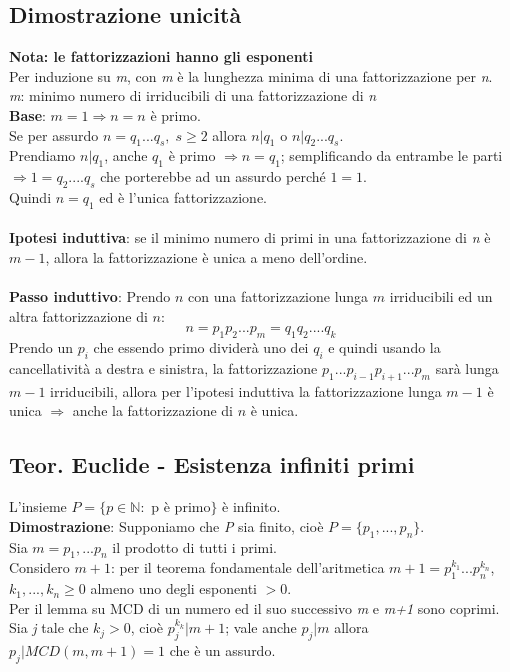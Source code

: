 \subsection{Dimostrazione unicità}
\textbf{Nota: le fattorizzazioni hanno gli esponenti}
\\Per induzione su \textit{m}, con \textit{m} è la lunghezza minima di una fattorizzazione per \textit{n}.
\\
\textit{m}: minimo numero di irriducibili di una fattorizzazione di \textit{n}
\\
\textbf{Base}: \(m=1\Rightarrow n=n\) è primo.
\\
Se per assurdo \(n=q_1...q_s,\; s\geq 2\) allora \(n|q_1\) o \(n|q_2...q_s\).
\\
Prendiamo \(n|q_1\), anche \(q_1\) è primo \(\Rightarrow n=q_1\); semplificando da entrambe le parti \(\Rightarrow 1=q_2....q_s\) che porterebbe ad un assurdo perché \(1=1\).
\\
Quindi \(n=q_1\) ed è l'unica fattorizzazione.
\\\\
\textbf{Ipotesi induttiva}: se il minimo numero di primi in una fattorizzazione di \textit{n} è \(m-1\), allora la fattorizzazione è unica a meno dell'ordine.
\\\\
\textbf{Passo induttivo}: Prendo $n$ con una fattorizzazione lunga $m$ irriducibili ed un altra fattorizzazione di $n$:
\[n=p_1p_2...p_m=q_1q_2....q_k\]
Prendo un $p_i$ che essendo primo dividerà uno dei $q_i$ e quindi usando la cancellatività a destra e sinistra, la fattorizzazione $p_1...p_{i-1}p_{i+1}...p_{m}$ sarà lunga $m-1$ irriducibili, allora per l'ipotesi induttiva la fattorizzazione lunga $m-1$ è unica $\Rightarrow$ anche la fattorizzazione di $n$ è unica.


\subsection{Teor. Euclide - Esistenza infiniti primi}
L'insieme \(P=\{p\in\mathbb{N} :\) p è primo\(\}\) è infinito.
\\
\textbf{Dimostrazione}: Supponiamo che \textit{P} sia finito, cioè \(P=\{p_1,...,p_n\}\).
\\
Sia \(m=p_1,...p_n\) il prodotto di tutti i primi.
\\
Considero \(m+1\): per il teorema fondamentale dell'aritmetica \(m+1=p_1^{k_1}...p_n^{k_n}\), \(k_1,...,k_n\geq 0\) almeno uno degli esponenti \(>0\).
\\
Per il lemma su MCD di un numero ed il suo successivo \textit{m} e \textit{m+1} sono coprimi.
\\
Sia \textit{j} tale che \(k_j>0\), cioè \(p_j^{k_k}|m+1\); vale anche \(p_j|m\) allora \(p_j|MCD(m, m+1)=1\) che è un assurdo.
